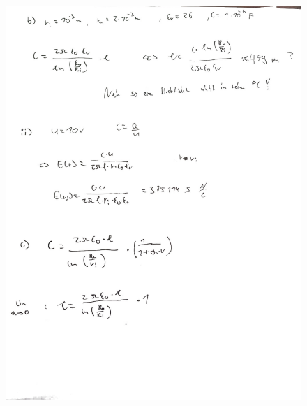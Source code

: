 \documentclass[11pt a4paper]{article}
\begin{document}
\begin{figure}[H]
	\centering
	\includegraphics[width=15cm]{roman/2_2_cleaned.jpg}
\end{figure}

\newpage
\end{document}
